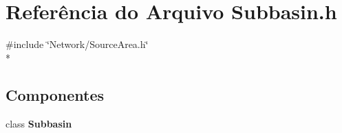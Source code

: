 \section{Referência do Arquivo Subbasin.\+h}
\label{_subbasin_8h}
{\ttfamily \#include \char`\"{}Network/\+Source\+Area.\+h\char`\"{}}\\*
\subsection*{Componentes}
\begin{DoxyCompactItemize}
\item 
class {\bf Subbasin}
\end{DoxyCompactItemize}
